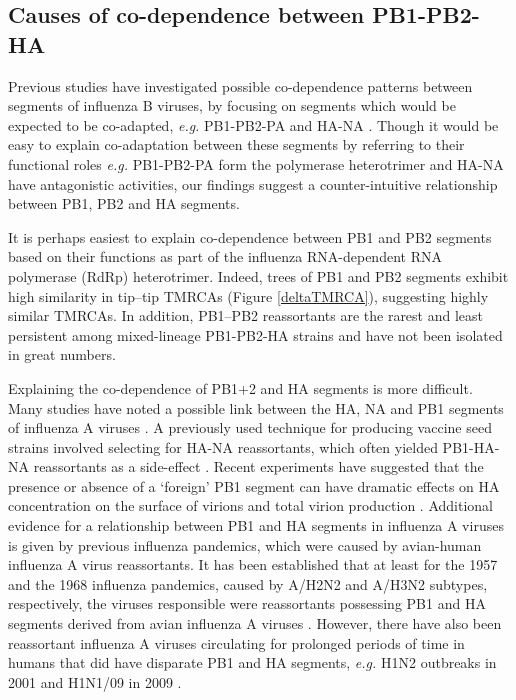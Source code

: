 \documentclass[11pt,oneside,letterpaper]{article}
\begin{document}
\subsection*{Causes of co-dependence between PB1-PB2-HA}
Previous studies have investigated possible co-dependence patterns between segments of influenza B viruses, by focusing on segments which would be expected to be co-adapted, \textit{e.g.} PB1-PB2-PA and HA-NA \citep{mccullers2004}.
Though it would be easy to explain co-adaptation between these segments by referring to their functional roles \textit{e.g.} PB1-PB2-PA form the polymerase heterotrimer and HA-NA have antagonistic activities, our findings suggest a counter-intuitive relationship between PB1, PB2 and HA segments.

It is perhaps easiest to explain co-dependence between PB1 and PB2 segments based on their functions as part of the influenza RNA-dependent RNA polymerase (RdRp) heterotrimer.
Indeed, trees of PB1 and PB2 segments exhibit high similarity in tip--tip TMRCAs (Figure \ref{deltaTMRCA}), suggesting highly similar TMRCAs.
In addition, PB1--PB2 reassortants are the rarest and least persistent among mixed-lineage PB1-PB2-HA strains and have not been isolated in great numbers.

Explaining the co-dependence of PB1+2 and HA segments is more difficult.
Many studies have noted a possible link between the HA, NA and PB1 segments of influenza A viruses \citep{bergeron2010,fulvini2011}.
A previously used technique for producing vaccine seed strains involved selecting for HA-NA reassortants, which often yielded PB1-HA-NA reassortants as a side-effect \citep{bergeron2010,fulvini2011}.
Recent experiments have suggested that the presence or absence of a `foreign' PB1 segment can have dramatic effects on HA concentration on the surface of virions and total virion production \citep{cobbin2013}.
Additional evidence for a relationship between PB1 and HA segments in influenza A viruses is given by previous influenza pandemics, which were caused by avian-human influenza A virus reassortants.
It has been established that at least for the 1957 and the 1968 influenza pandemics, caused by A/H2N2 and A/H3N2 subtypes, respectively, the viruses responsible were reassortants possessing PB1 and HA segments derived from avian influenza A viruses \citep{kawaoka1989}.
However, there have also been reassortant influenza A viruses circulating for prolonged periods of time in humans that did have disparate PB1 and HA segments, \textit{e.g.} H1N2 outbreaks in 2001 \citep{gregory2002} and H1N1/09 in 2009 \citep{smith2009}.
\end{document}
